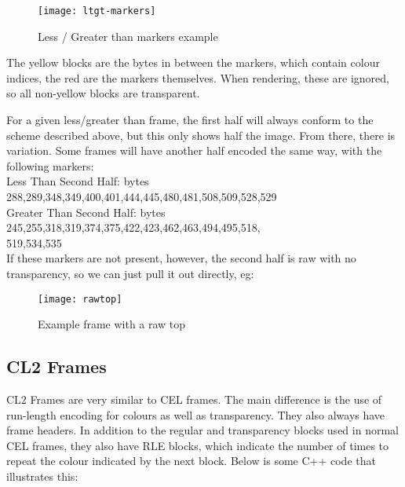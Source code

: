 \begin{itemize}
	\begin{figure}[H]
		\centering
		\texttt{[image: ltgt-markers]}
		\caption{Less / Greater than markers example}
	\end{figure}
	
The yellow blocks are the bytes in between the markers, which contain colour indices, the red are the markers themselves. When rendering, these are ignored, so all non-yellow blocks are transparent.

	For a given less/greater than frame, the first half will always conform to the scheme described above, but this only shows half the image.
	From there, there is variation. Some frames will have another half encoded the same way, with the following markers:\\
	Less Than Second Half: bytes 288,289,348,349,400,401,444,445,480,481,508,509,528,529\\
	Greater Than Second Half: bytes 245,255,318,319,374,375,422,423,462,463,494,495,518,\\
	519,534,535\\
	
	If these markers are not present, however, the second half is raw with no transparency, so we can just pull it out directly, eg:\\
	
	\begin{figure}[H]
		\centering
		\texttt{[image: rawtop]}
		\caption{Example frame with a raw top}
	\end{figure}
	
\end{itemize}


\subsection{CL2 Frames}
	CL2 Frames are very similar to CEL frames. The main difference is the use of run-length encoding for colours as well as transparency. They also always have frame headers.
   In addition to the regular and transparency blocks used in normal CEL frames, they also have RLE blocks, which indicate the number of times to repeat the colour indicated by the next block.
   Below is some C++ code that illustrates this:
   

